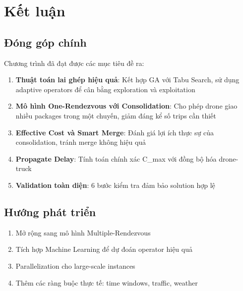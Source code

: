 \documentclass[12pt,a4paper]{article}
\begin{document}
\section{Kết luận}

\subsection{Đóng góp chính}

Chương trình đã đạt được các mục tiêu đề ra:

\begin{enumerate}
    \item \textbf{Thuật toán lai ghép hiệu quả}: Kết hợp GA với Tabu Search, sử dụng adaptive operators để cân bằng exploration và exploitation
    
    \item \textbf{Mô hình One-Rendezvous với Consolidation}: Cho phép drone giao nhiều packages trong một chuyến, giảm đáng kể số trips cần thiết
    
    \item \textbf{Effective Cost và Smart Merge}: Đánh giá lợi ích thực sự của consolidation, tránh merge không hiệu quả
    
    \item \textbf{Propagate Delay}: Tính toán chính xác C\_max với đồng bộ hóa drone-truck
    
    \item \textbf{Validation toàn diện}: 6 bước kiểm tra đảm bảo solution hợp lệ
\end{enumerate}

\subsection{Hướng phát triển}

\begin{enumerate}
    \item Mở rộng sang mô hình Multiple-Rendezvous
    \item Tích hợp Machine Learning để dự đoán operator hiệu quả
    \item Parallelization cho large-scale instances
    \item Thêm các ràng buộc thực tế: time windows, traffic, weather
\end{enumerate}

\end{document}

